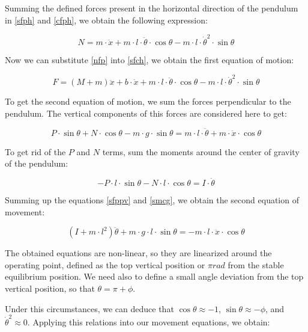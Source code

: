 Summing the defined forces present in the horizontal direction of the pendulum in \ref{sfph} and \ref{cfph}, we obtain the following expression:

\begin{equation} \label{nfp}
	N=m\cdot \ddot{x}+m\cdot l\cdot \ddot{\theta}\cdot \cos{\theta}-m\cdot l\cdot \dot{\theta}^2\cdot \sin{\theta}
\end{equation}

Now we can substitute \ref{nfp} into \ref{sfch}, we obtain the first equation of motion:

\begin{equation} \label{fem}
	F=(M+m)\ddot{x}+b\cdot \dot{x}+m\cdot l\cdot \ddot{\theta}\cdot \cos{\theta}-m\cdot l\cdot \dot{\theta}^2\cdot \sin{\theta}
\end{equation}

To get the second equation of motion, we sum the forces perpendicular to the pendulum. The vertical components of this forces are considered here to get:

\begin{equation} \label{sfppv}
	P\cdot \sin{\theta}+N\cdot \cos{\theta}-m\cdot g\cdot \sin{\theta}=m\cdot l\cdot \ddot{\theta}+m\cdot \ddot{x}\cdot \cos{\theta}
\end{equation}

To get rid of the $P$ and $N$ terms, sum the moments around the center of gravity of the pendulum:

\begin{equation} \label{smcg}
	-P\cdot l\cdot \sin{\theta}-N\cdot l\cdot \cos{\theta}=I\cdot \ddot{\theta}
\end{equation}

Summing up the equations \ref{sfppv} and \ref{smcg}, we obtain the second equation of movement:

\begin{equation} \label{sem}
	(I+m\cdot l^2)\ddot{\theta}+m\cdot g\cdot l\cdot \sin{\theta}=-m\cdot l\cdot \ddot{x}\cdot \cos{\theta}
\end{equation}

The obtained equations are non-linear, so they are linearized around the operating point, defined as the top vertical position or $\pi rad$ from the stable equilibrium position. We need also to define a small angle deviation from the top vertical position, so that $\theta=\pi+\phi$.

Under this circumstances, we can deduce that $\cos{\theta}\approx -1$, $\sin{\theta}\approx -\phi$, and $\dot{\theta}^2\approx 0$. Applying this relations into our movement equations, we obtain:

